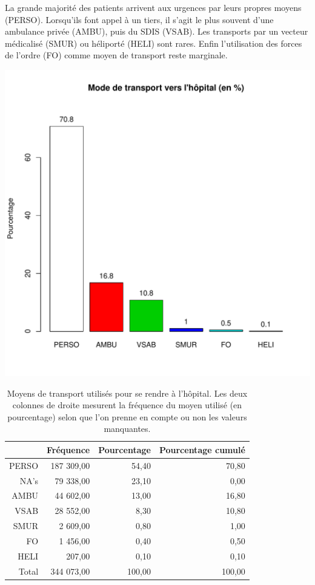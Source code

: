 \documentclass[12pt,english,french,twoside]{book}\usepackage[]{graphicx}\usepackage[]{color}
\makeatletter
\def\maxwidth{ %
  \ifdim\Gin@nat@width>\linewidth
    \linewidth
  \else
    \Gin@nat@width
  \fi
}
\makeatother
\begin{document}
La grande majorité des patients arrivent aux urgences par leurs propres moyens (PERSO). Lorsqu'ils font appel à un tiers, il s'agit le plus souvent d'une ambulance privée (AMBU), puis du SDIS (VSAB). Les transports par un vecteur médicalisé (SMUR) ou héliporté (HELI) sont rares. Enfin l'utilisation des forces de l'ordre (FO) comme moyen de transport reste marginale.


\includegraphics[width=\maxwidth]{figure/transport-1} 
\begin{table}[ht]
\centering
\begin{tabular}{rrrr}
  \hline
 & Fréquence & Pourcentage & Pourcentage cumulé \\ 
  \hline
PERSO & 187 309,00 & 54,40 & 70,80 \\ 
  NA's & 79 338,00 & 23,10 & 0,00 \\ 
  AMBU & 44 602,00 & 13,00 & 16,80 \\ 
  VSAB & 28 552,00 & 8,30 & 10,80 \\ 
  SMUR & 2 609,00 & 0,80 & 1,00 \\ 
  FO & 1 456,00 & 0,40 & 0,50 \\ 
  HELI & 207,00 & 0,10 & 0,10 \\ 
    Total & 344 073,00 & 100,00 & 100,00 \\ 
   \hline
\end{tabular}
\caption[Moyens de transport]{Moyens de transport utilisés pour se rendre à l'hôpital. Les deux colonnes de droite mesurent la fréquence du moyen utilisé (en pourcentage) selon que l'on prenne en compte ou non les valeurs manquantes. } 
\label{transport}
\end{table}
\end{document}

